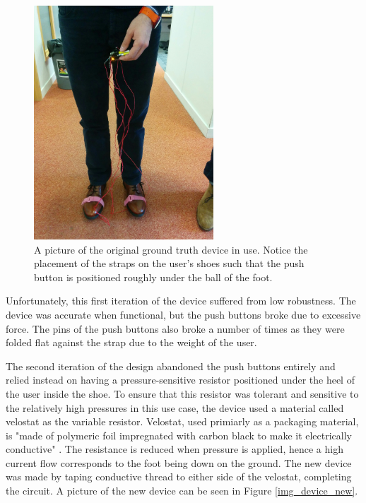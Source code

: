             \begin{figure}[!th]
                \includegraphics[width=0.6\textwidth]{Images/device_og_use.jpg}
                \centering
                \caption{A picture of the original ground truth device in use. Notice the placement of the straps on the user's shoes such that the push button is positioned roughly under the ball of the foot.}
                \label{img_device_og_use}
            \end{figure}

            Unfortunately, this first iteration of the device suffered from low robustness. The device was accurate when functional, but the push buttons broke due to excessive force. The pins of the push buttons also broke a number of times as they were folded flat against the strap due to the weight of the user.

            The second iteration of the design abandoned the push buttons entirely and relied instead on having a pressure-sensitive resistor positioned under the heel of the user inside the shoe. To ensure that this resistor was tolerant and sensitive to the relatively high pressures in this use case, the device used a material called velostat as the variable resistor. Velostat, used primiarly as a packaging material, is "made of polymeric foil impregnated with carbon black to make it electrically conductive" \cite{velostat}. The resistance is reduced when pressure is applied, hence a high current flow corresponds to the foot being down on the ground. The new device was made by taping conductive thread to either side of the velostat, completing the circuit. A picture of the new device can be seen in Figure \ref{img_device_new}.

